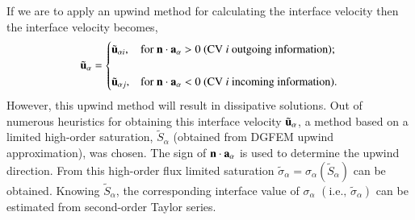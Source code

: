 \documentclass[preprint,authoryear,12pt]{elsarticle}
\begin{document}
If we are to apply an upwind method for calculating the interface velocity then the interface velocity becomes, %
\begin{displaymath}
{\tilde{\bf u}}_{\alpha} =
\begin{cases}
\tilde{\bf u}_{\alpha i}, & \text{for } {\bf n}\cdot{\bf a}_{\alpha}>0 \text{ (CV {\it i} outgoing information);} \\
                        &                                                                                      \\
\tilde{\bf u}_{\alpha j}, & \text{for } {\bf n}\cdot{\bf a}_{\alpha}<0 \text{ (CV {\it i} incoming information).} 
\end{cases}
\end{displaymath}
However, this upwind method will result in dissipative solutions. Out of numerous heuristics for obtaining this interface velocity ${\tilde{\bf u}}_\alpha$, a method based on a limited high-order saturation, $\tilde S_\alpha$ (obtained from DGFEM upwind approximation), was chosen. The sign of ${\bf n}\cdot {\bf a}_\alpha$ is used to determine the upwind direction. From this high-order flux limited saturation $\tilde{\sigma}_{\alpha} = \sigma_{\alpha}\left(\tilde{S}_{\alpha}\right)$ can be obtained. Knowing $\tilde{S}_{\alpha}$, the corresponding interface value of $\sigma_\alpha$ $\left(\text{i.e., }\tilde{\sigma}_{\alpha}\right)$ can be estimated from second-order Taylor series. 
\end{document}
